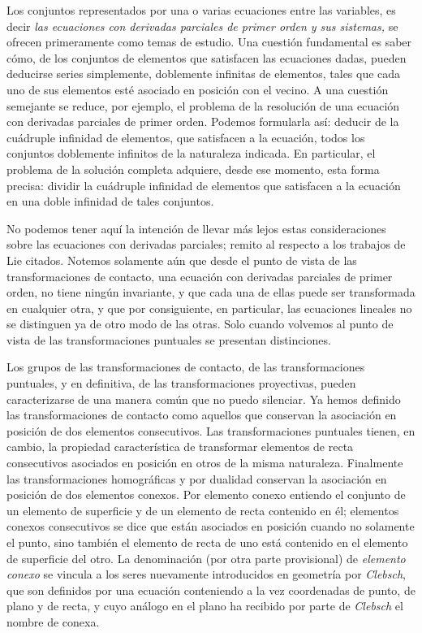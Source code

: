 \documentclass[a4paper, 12pt]{article}
\begin{document}
Los conjuntos representados por una o varias ecuaciones entre las variables, es decir \textit{las ecuaciones con derivadas parciales de primer orden y sus sistemas, }se ofrecen primeramente como temas de estudio. Una cuestión fundamental es saber cómo, de los conjuntos de elementos que satisfacen las ecuaciones dadas, pueden deducirse series simplemente, doblemente infinitas de elementos, tales que cada uno de sus elementos esté asociado en posición con el vecino. A una cuestión semejante se reduce, por ejemplo, el problema de la resolución de una ecuación con derivadas parciales de primer orden. Podemos formularla así: deducir de la cuádruple infinidad de elementos, que satisfacen a la ecuación, todos los conjuntos doblemente infinitos de la naturaleza indicada. En particular, el problema de la solución completa adquiere, desde ese momento, esta forma precisa: dividir la cuádruple infinidad de elementos que satisfacen a la ecuación en una doble infinidad de tales conjuntos.

No podemos tener aquí la intención de llevar más lejos estas consideraciones sobre las ecuaciones con derivadas parciales; remito al respecto a los trabajos de Lie citados. Notemos solamente aún que desde el punto de vista de las transformaciones de contacto, una ecuación con derivadas parciales de primer orden, no tiene ningún invariante, y que cada una de ellas puede ser transformada en cualquier otra, y que por consiguiente, en particular, las ecuaciones lineales no se distinguen ya de otro modo de las otras. Solo cuando volvemos al punto de vista de las transformaciones puntuales se presentan distinciones.

Los grupos de las transformaciones de contacto, de las transformaciones puntuales, y en definitiva, de las transformaciones proyectivas, pueden caracterizarse de una manera común que no puedo silenciar. Ya hemos definido las transformaciones de contacto como aquellos que conservan la asociación en posición de dos elementos consecutivos. Las transformaciones puntuales tienen, en cambio, la propiedad característica de transformar elementos de recta consecutivos asociados en posición en otros de la misma naturaleza. Finalmente las transformaciones homográficas y por dualidad conservan la asociación en posición de dos elementos conexos. Por elemento conexo entiendo el conjunto de un elemento de superficie y de un elemento de recta contenido en él; elementos conexos consecutivos se dice que están asociados en posición cuando no solamente el punto, sino también el elemento de recta de uno está contenido en el elemento de superficie del otro. La denominación (por otra parte provisional) de \textit{elemento conexo} se vincula a los seres nuevamente introducidos en geometría por \textit{Clebsch}, que son definidos por una ecuación conteniendo a la vez coordenadas de punto, de plano y de recta, y cuyo análogo en el plano ha recibido por parte de \textit{Clebsch} el nombre de conexa. 
\end{document}
